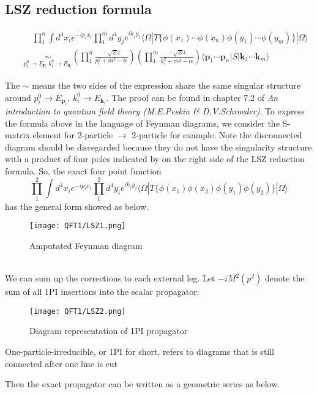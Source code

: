 \subsection{LSZ reduction formula}
\begin{newthem}
\begin{eqnarray}
&& \quad \prod_1^n \int d^4 x_i e^{-ip_ix_i} \prod_1^m d^4 y_j e^{ik_jy_j} \langle \Omega | T \{\phi(x_1) \cdots \phi(x_n) \phi(y_1) \cdots \phi(y_m)\} | \Omega \rangle \nonumber \\
&& \underset{ p_i^0 \to E_{\bm{p}_i}\, k_i^0 \to E_{\bm{k}_i}}{\sim}  \left( \prod_1^n \frac{-\sqrt{Z} i}{p_i^2 + m^2 -i\epsilon} \right) \left( \prod_1^m \frac{-\sqrt{Z} i}{k_i^2 + m^2 -i\epsilon} \right) \langle \bm{p}_1 \cdots \bm{p}_n | S | \bm{k}_1 \cdots \bm{k}_m \rangle \nonumber
\end{eqnarray}
\end{newthem}
\noindent
The $\sim$ means the two sides of the expression share the same singular structure around $p_i^0 \to E_{\bm{p}_i}$, $k_i^0 \to E_{\bm{k}_i}$.
The proof can be found in chapter 7.2 of \emph{An introduction to quantum field theory (M.E.Peskin \& D.V.Schroeder)}.
To express the formula above in the language of Feynman diagrams, we consider the S-matrix element for 2-particle $\to$ 2-particle for example. Note the disconnected diagram should be disregarded because they do not have the singularity structure with a product of four poles indicated by on the right side of the LSZ reduction formula. So, the exact four point function
\[\prod_1^2 \int d^4 x_i e^{-ip_ix_i} \prod_1^2 d^4 y_i e^{ik_jy_j} \langle \Omega | T \{\phi(x_1)\phi(x_2)\phi(y_1) \phi(y_2)\} | \Omega \rangle \]
has the general form showed as below.
\begin{figure}[!h]
\centering
\texttt{[image: QFT1/LSZ1.png]}
\caption{Amputated Feynman diagram}
\end{figure}\\
We can sum up the corrections to each external leg. Let $-iM^2(p^2)$ denote the sum of all 1PI insertions into the scalar propagator:
\begin{figure}[!h]
\centering
\texttt{[image: QFT1/LSZ2.png]}
\caption{Diagram representation of 1PI propagator}
\end{figure}
\begin{note}
One-particle-irreducible, or 1PI for short, refers to diagrams that is still connected after one line is cut
\end{note}
\noindent
Then the exact propagator can be written as a geometric series as below.
